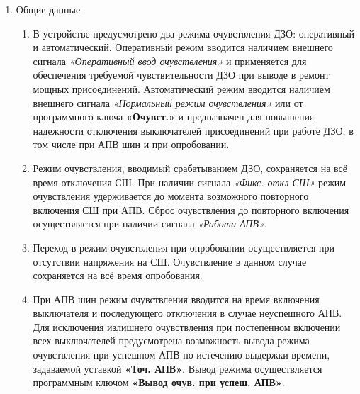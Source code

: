 \color{black}

\begin{enumerate}[label=\arabic{section}.\arabic{subsection}.\arabic{enumi}, labelsep=4pt, leftmargin=0pt, itemindent=57pt, itemsep=0pt, parsep=5pt] %


\item Общие данные

\begin{enumerate}[label=\arabic{section}.\arabic{subsection}.\arabic{enumi}.\arabic*, labelsep=4pt, leftmargin=0em, itemindent=65pt, parsep=0pt]

\item
В устройстве предусмотрено два режима очувствления ДЗО: оперативный и автоматический.
Оперативный режим вводится наличием внешнего сигнала \textit{«Оперативный ввод очувствления»} и применяется
для обеспечения требуемой чувствительности ДЗО при выводе в ремонт мощных присоединений.
Автоматический режим вводится наличием внешнего сигнала \textit{«Нормальный режим очувствления»} или от
программного ключа \textbf{«Очувст.»} и предназначен для повышения надежности отключения выключателей
присоединений при работе ДЗО, в том числе при АПВ шин и при опробовании.

\item
Режим очувствления, вводимый срабатыванием ДЗО, сохраняется на всё время отключения СШ. При
наличии сигнала \textit{«Фикс. откл СШ»} режим очувствления удерживается до момента возможного повторного
включения СШ при АПВ. Сброс очувствления до повторного включения осуществляется при наличии сигнала
\textit{«Работа АПВ»}.

\item
Переход в режим очувствления при опробовании осуществляется при отсутствии напряжения на СШ.
Очувствление в данном случае сохраняется на всё время опробования.

\item
При АПВ шин режим очувствления вводится на время включения выключателя и последующего
отключения в случае неуспешного АПВ. Для исключения излишнего очувствления при постепенном включении
всех выключателей предусмотрена возможность вывода режима очувствления при успешном АПВ по
истечению выдержки времени, задаваемой уставкой \textbf{«Точ. АПВ»}. Вывод режима осуществляется
программным ключом \textbf{«Вывод очув. при успеш. АПВ»}.


\end{enumerate}
\end{enumerate}
